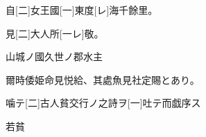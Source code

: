 \documentclass[a4paper,tate]{jlreq}
\begin{document}
\Kanbun
自[二]女王國[一]東度[レ]海千餘里。
\EndKanbun
\printkanbun

\Kanbun
見[二]大人所[一レ]敬。
\EndKanbun
\printkanbun

\Kanbun
山城{ノ}國久世{ノ}郡水主
\EndKanbun
\printkanbun

爾時倭姫命見悦給、其處魚見社定賜とあり。


\Kanbun
噛{テ}[二]古人貧交行{ノ}之詩{ヲ}[一]吐{テ}而戯序{ス}
\EndKanbun
\printkanbun

\scriptsize{}\zw\normalsize{}若\scriptsize{}\zw\normalsize{}貧



\newpage
\end{document}
